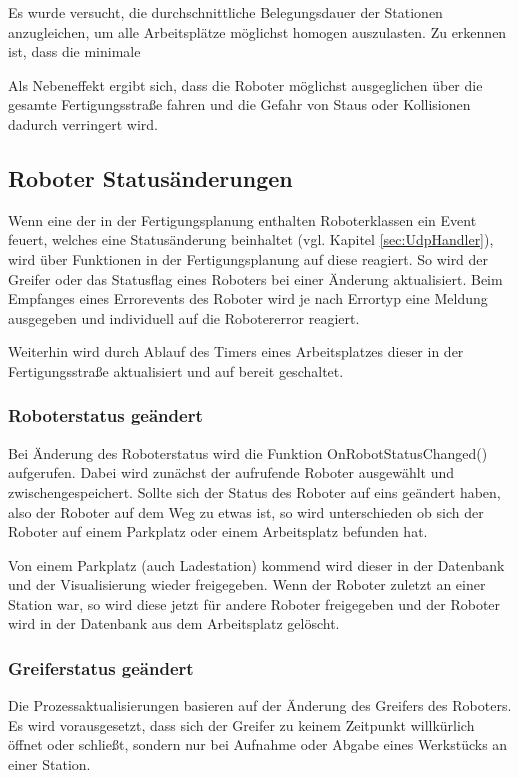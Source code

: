 Es wurde versucht, die durchschnittliche Belegungsdauer der Stationen anzugleichen, um alle Arbeitsplätze möglichst homogen auszulasten. Zu erkennen ist, dass die minimale

Als Nebeneffekt ergibt sich, dass die Roboter möglichst ausgeglichen über die gesamte Fertigungsstraße fahren und die Gefahr von Staus oder Kollisionen dadurch verringert wird. 

\subsection{Roboter Statusänderungen}

Wenn eine der in der Fertigungsplanung enthalten Roboterklassen ein Event feuert, welches eine Statusänderung beinhaltet (vgl. Kapitel \ref{sec:UdpHandler}), wird über Funktionen in der Fertigungsplanung auf diese reagiert. So wird der Greifer oder das Statusflag eines Roboters bei einer Änderung aktualisiert. Beim Empfanges eines Errorevents des Roboter wird je nach Errortyp eine Meldung ausgegeben und individuell auf die Robotererror reagiert. 

Weiterhin wird durch Ablauf des Timers eines Arbeitsplatzes dieser in der Fertigungsstraße aktualisiert und auf bereit geschaltet. 


\subsubsection{Roboterstatus geändert}

Bei Änderung des Roboterstatus wird die Funktion OnRobotStatusChanged() aufgerufen. Dabei wird zunächst der aufrufende Roboter ausgewählt und zwischengespeichert. Sollte sich der Status des Roboter auf eins geändert haben, also der Roboter auf dem Weg zu etwas ist, so wird unterschieden ob sich der Roboter auf einem Parkplatz oder einem Arbeitsplatz befunden hat.

Von einem Parkplatz (auch Ladestation) kommend wird dieser in der Datenbank und der Visualisierung wieder freigegeben. Wenn der Roboter zuletzt an einer Station war, so wird diese jetzt für andere Roboter freigegeben und der Roboter wird in der Datenbank aus dem Arbeitsplatz gelöscht. 

\subsubsection{Greiferstatus geändert}

Die Prozessaktualisierungen basieren auf der Änderung des Greifers des Roboters. Es wird vorausgesetzt, dass sich der Greifer zu keinem Zeitpunkt willkürlich öffnet oder schließt, sondern nur bei Aufnahme oder Abgabe eines Werkstücks an einer Station. 

